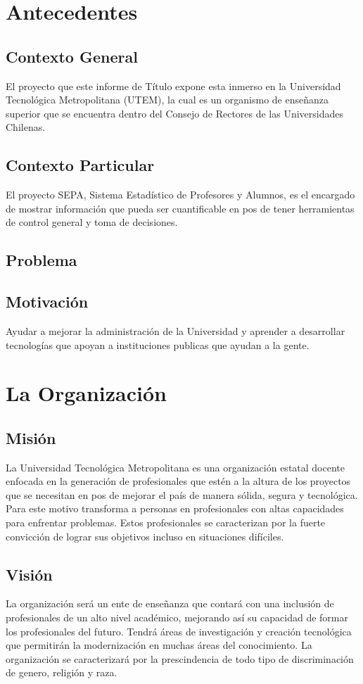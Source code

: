\documentclass[a4paper,12pt,openany,oneside]{book}
\begin{document}
\chapter{Antecedentes}
\thispagestyle{empty}
\section{Contexto General}
El proyecto que este informe de Título expone esta inmerso en la Universidad Tecnológica Metropolitana (UTEM), la cual es un organismo de enseñanza superior que se encuentra dentro del Consejo de Rectores de las Universidades Chilenas.
\section{Contexto Particular}
El proyecto SEPA, Sistema Estadístico de Profesores y Alumnos, es el encargado de mostrar información que pueda ser cuantificable en pos de tener herramientas de control general y toma de decisiones.
\section{Problema}
\section{Motivación}
Ayudar a mejorar la administración de la Universidad y aprender a desarrollar tecnologías que apoyan a instituciones publicas que ayudan a la gente.
\chapter{La Organización}
\thispagestyle{empty}
\section{Misión}
La Universidad Tecnológica Metropolitana es una organización estatal docente enfocada en la generación de profesionales que estén a la altura de los proyectos que se necesitan en pos de mejorar el país de manera sólida, segura y tecnológica. Para este motivo transforma a personas en profesionales con altas capacidades para enfrentar problemas. Estos profesionales se caracterizan por la fuerte convicción de lograr sus objetivos incluso en situaciones difíciles.
\section{Visión}
La organización será un ente de enseñanza que contará con una inclusión de profesionales de un alto nivel académico, mejorando así su capacidad de formar los profesionales del futuro. Tendrá áreas de investigación y creación tecnológica que permitirán la modernización en muchas áreas del conocimiento. La organización se caracterizará por la prescindencia de todo tipo de discriminación de genero, religión y raza.
\end{document}
